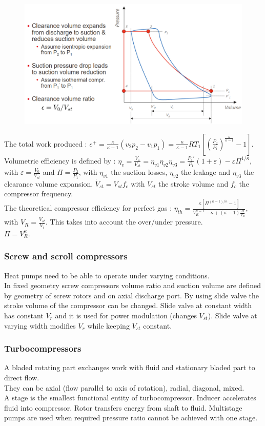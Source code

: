 \documentclass[../main.tex]{subfiles}
\begin{document}
\begin{figure}[hbt!]
    \centering
    \includegraphics[width=0.5\linewidth]{IMAGES/HP/Screenshot from 2025-04-10 09-38-17.png}
\end{figure}

The total work produced : $e^+ = \frac{\kappa}{\kappa-1} (v_2p_2-v_1p_1) = \frac{\kappa}{\kappa-1} RT_1 [(\frac{P_2}{P_1})^{\frac{\kappa}{\kappa-1}}-1]$.\\

Volumetric efficiency is defined by : $\eta_v = \frac{V_s}{V_{st}} = \eta_{v1} \eta_{v2} \eta_{v3} =\frac{P_1'}{P_1}(1+\varepsilon) - \varepsilon \Pi^{1/\kappa}$, with $\varepsilon = \frac{V_0}{V_{st}}$ and $\Pi = \frac{P_2}{P_1}$, with $\eta_{v1}$ the suction losses, $\eta_{v2}$ the leakage and $\eta_{v3}$ the clearance volume expansion. $\dot{V}_{st} = V_{st} f_c$ with $V_{st}$ the stroke volume and $f_c$ the compressor frequency.\\

The theoretical compressor efficiency for perfect gas : $\eta_{th} = \frac{\kappa[\Pi^{(\kappa-1)/\kappa}-1]}{V_R^{\kappa-1}-\kappa+(\kappa-1)\frac{\Pi}{V_R}}$, with $V_R = \frac{V_{st}}{V_i}$. This takes into account the over/under pressure.\\
$\Pi = V_R^\kappa$.\\

\subsubsection{Screw and scroll compressors}
Heat pumps need to be able to operate under varying conditions. \\
In fixed geometry screw compressors volume ratio and suction volume are defined by geometry of screw rotors and on axial discharge port. By using slide valve the stroke volume of the compressor can be changed. Slide valve at constant width has constant $V_r$ and it is used for power modulation (changes $V_{st}$). Slide valve at varying width modifies $V_r$ while keeping $V_{st}$ constant. 

\subsubsection{Turbocompressors}
A bladed rotating part exchanges work with fluid and stationary bladed part to direct flow. \\
They can be axial (flow parallel to axis of rotation), radial, diagonal, mixed.\\
A stage is the smallest functional entity of turbocompressor. Inducer accelerates fluid into compressor. Rotor transfers energy from shaft to fluid. Multistage pumps are used when required pressure ratio cannot be achieved with one stage.\\
\end{document}
